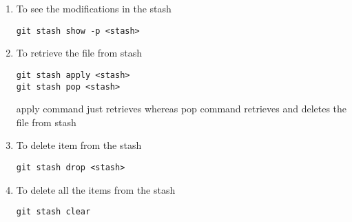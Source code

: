 \documentclass[paper=a4, fontsize=12pt]{scrartcl}
\begin{document}
\begin{enumerate}
\item To see the modifications in the stash
\begin{lstlisting}
git stash show -p <stash>
\end{lstlisting}
\item To retrieve the file from stash
\begin{lstlisting}
git stash apply <stash>
git stash pop <stash>
\end{lstlisting}
apply command just retrieves whereas pop command retrieves and deletes the file from stash
\item To delete item from the stash
\begin{lstlisting}
git stash drop <stash>
\end{lstlisting}
\item To delete all the items from the stash
\begin{lstlisting}
git stash clear
\end{lstlisting}
\end{enumerate}
\end{document}
